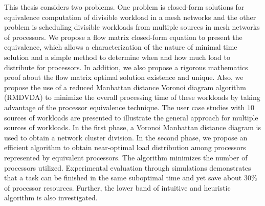 This thesis considers two problems.  One problem is closed-form solutions for equivalence computation \cite{robertazzi1993processor} of divisible workload in a mesh networks and the other problem is scheduling divisible workloads from multiple sources in mesh networks of processors.  We propose a flow matrix closed-form equation to present the equivalence, which allows a characterization of the nature of minimal time solution and a simple method to determine when and how much load to distribute for processors.  In addition, we also propose a rigorous mathematics proof about the flow matrix optimal solution existence and unique.  Also, we propose the use of a reduced Manhattan distance Voronoi diagram algorithm (RMDVDA) to minimize the overall processing time of these workloads by taking advantage of the processor equivalence technique.  The user case studies with $10$ sources of workloads are presented to illustrate the general approach for multiple sources of workloads.  In the first phase, a Voronoi Manhattan distance diagram is used to obtain a network cluster division.  In the second phase, we propose an efficient algorithm to obtain near-optimal load distribution among processors represented by equivalent processors.  The algorithm minimizes the number of processors utilized.  Experimental evaluation through simulations demonstrates that a task can be finished in the same suboptimal time and yet save about $30\%$ of processor resources.  Further, the lower band of intuitive and heuristic algorithm is also investigated.